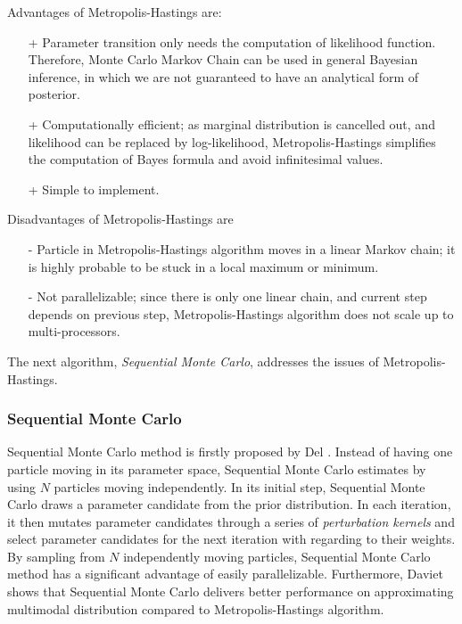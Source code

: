 Advantages of Metropolis-Hastings are:
\begin{itemize}
    \item[+] Parameter transition only needs the computation of likelihood function.
          Therefore, Monte Carlo Markov Chain can be used in general Bayesian inference,
          in which we are not guaranteed to have an analytical form of posterior.
    \item[+] Computationally efficient; as marginal distribution is cancelled out, and likelihood can
          be replaced by log-likelihood, Metropolis-Hastings simplifies the computation of Bayes formula
          and avoid infinitesimal values.
    \item[+] Simple to implement.
\end{itemize}
Disadvantages of Metropolis-Hastings are
\begin{enumerate}
    \item[-] Particle in Metropolis-Hastings algorithm moves in a linear Markov chain; it is highly
          probable to be stuck in a local maximum or minimum.
    \item[-] Not parallelizable; since there is only one linear chain, and current step depends on
          previous step, Metropolis-Hastings algorithm does not scale up to multi-processors.
\end{enumerate}
The next algorithm, \textit{Sequential Monte Carlo}, addresses the issues of Metropolis-Hastings.

\subsubsection{Sequential Monte Carlo}
Sequential Monte Carlo method is firstly proposed by Del \cite{del2006sequential}. Instead of having
one particle moving in its parameter space, Sequential Monte Carlo estimates by using $N$ particles
moving independently. In its initial step, Sequential Monte Carlo draws a parameter candidate from
the prior distribution. In each iteration, it then mutates parameter candidates through a series of
\textit{perturbation kernels} and select parameter candidates for the next iteration with regarding
to their weights. By sampling from $N$ independently moving particles, Sequential Monte Carlo method
has a significant advantage of easily parallelizable. Furthermore, Daviet \cite{daviet2018inference}
shows that Sequential Monte Carlo delivers better performance on approximating multimodal
distribution compared to Metropolis-Hastings algorithm.

